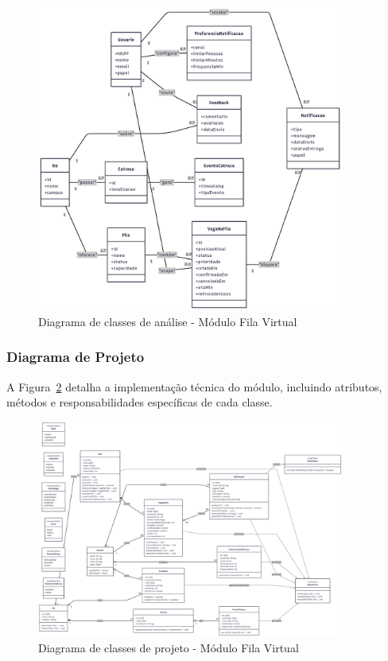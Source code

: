 \documentclass[12pt,a4paper]{article}
\begin{document}
\begin{figure}[H]
    \centering
    \includegraphics[width=0.9\textwidth]{diagramas/Diagramas de classe/Fila_diagrama_analise.png}
    \caption{Diagrama de classes de análise - Módulo Fila Virtual}
    \label{fig:classe_fila_analise}
\end{figure}

\subsubsection{Diagrama de Projeto}

A Figura~\ref{fig:classe_fila_projeto} detalha a implementação técnica do módulo, incluindo atributos, métodos e responsabilidades específicas de cada classe.

\begin{figure}[H]
    \centering
    \includegraphics[width=0.9\textwidth]{diagramas/Diagramas de classe/Fila_diagrama_projeto.png}
    \caption{Diagrama de classes de projeto - Módulo Fila Virtual}
    \label{fig:classe_fila_projeto}
\end{figure}
\end{document}
